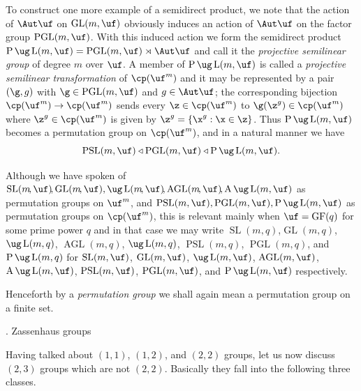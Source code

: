 To construct one more example of a semidirect product, we 
note that the action
of $\Aut \uf$ on $\operatorname{GL}(m,\uf)$ obviously 
induces an action of $\Aut \uf$ on
the factor group $\operatorname{PGL}(m,\uf)$.  With this 
induced action we form the
semidirect product $\operatorname{P}\ug\operatorname{L}
(m,\uf) = \operatorname{PGL}(m,\uf) \rtimes \Aut \uf$ and
call it the {\it projective semilinear group} of degree 
$m$ over $\uf$.
A member of $\operatorname{P}\ug\operatorname{L}
(m,\uf)$ is called a {\it projective semilinear 
transformation} of $\cp (\uf^m)$ and it may be represented 
by a pair
$(\g,g)$ with $\g \in \operatorname{PGL}(m,\uf)$ and $g 
\in \Aut \uf$; the corresponding
bijection $\cp(\uf^m) \to \cp(\uf^m)$ sends every $\z \in 
\cp(\uf^m)$ to
$\g(\z^g) \in \cp(\uf^m)$ where $\z^g\in\cp(\uf^m)$ is 
given by 
$\z^g=\{\x^g:\x \in \z \}$.  Thus
$\operatorname{P}\ug\operatorname{L}
(m,\uf)$ becomes a permutation group on $\cp (\uf^m)$, and 
in a
natural manner we have
$$
\operatorname{PSL}(m,\uf)\triangleleft 
\operatorname{PGL}(m,\uf) \triangleleft 
\operatorname{P}\ug\operatorname{L}
(m,\uf).
$$

Although we have spoken of
$\operatorname{SL}(m\!,\uf)\!,\operatorname{GL}(m\!,\uf),%
\ug\operatorname{L}(m
\!,\uf)\!,\operatorname{AGL}(m\!,\uf)\!,\operatorname{A}\ug
\operatorname{L}(m,\uf)$ as permutation groups on $\uf^m$, 
and $\operatorname
{PSL}(m,\uf), \operatorname{PGL}(m,\uf),\operatorname{P}\ug
\operatorname{L}(m,\uf)$ as permutation groups on $\cp 
(\uf^m)$, this is 
relevant mainly when $\uf = \operatorname{GF}(q)$ for some 
prime power $q$ and 
in that case we may write 
$\operatorname{SL}(m,q)$,$\operatorname{GL}
(m,q)$, $\ug\operatorname{L}(m,q)$, 
$\operatorname{AGL}(m,q)$,
$\ug\operatorname{L}(m,q)$, $\operatorname{PSL}(m,q)$, 
$\operatorname{PGL}(m,q)$, 
and $\operatorname{P}\ug\operatorname{L}(m,q)$ for 
$\operatorname{SL}(m,\uf)$, $\operatorname{GL}
(m,\uf)$, $\ug\operatorname{L}(m,\uf)$, 
$\operatorname{AGL}(m,\uf)$,
$\operatorname{A}\ug \operatorname{L}(m,\uf)$,
$\operatorname{PSL}(m,\uf)$, $\operatorname{PGL}(m,\uf)$, 
and $\operatorname{P}
 \ug \operatorname{L}(m,\uf)$ 
respectively.

Henceforth by a {\it permutation group} we shall again 
mean a permutation group
on a finite set.

. Zassenhaus groups\endheading

Having talked about
$(1,1)$, $(1,2)$, and $(2,2)$ groups, let us now discuss 
$(2,3)$ groups
which are not $(2,2)$.  Basically they fall into the 
following three classes.

